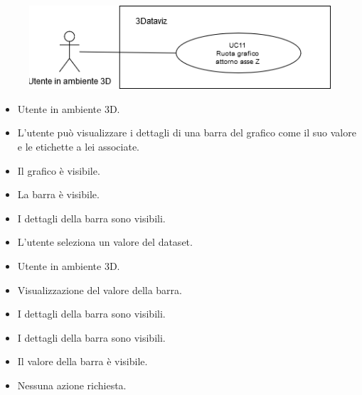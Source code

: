 \begin{figure}[h!]\centering
    \includegraphics[scale=0.7]{template/images/UC11.png}
    \caption{}
\end{figure}
\UCdsc
{ %
    \begin{itemize}
        \item Utente in ambiente 3D.
    \end{itemize}
}
{ %
    \begin{itemize}
        \item L'utente può visualizzare i dettagli di una barra del grafico come il suo valore e le etichette a lei associate.
    \end{itemize}
}
{ %
    \begin{itemize}
        \item Il grafico è visibile.
        \item La barra è visibile.
    \end{itemize}
}
{ %
    \begin{itemize}
        \item I dettagli della barra sono visibili.
    \end{itemize}
}
{ %
    \begin{itemize}
        \item L'utente seleziona un valore del dataset. 
    \end{itemize}
}

\UCdsc
{ %
    \begin{itemize}
        \item Utente in ambiente 3D.
    \end{itemize}
}
{ %
    \begin{itemize}
        \item Visualizzazione del valore della barra.
    \end{itemize}
}
{ %
    \begin{itemize}
        \item I dettagli della barra sono visibili.
    \end{itemize}
}
{ %
    \begin{itemize}
        \item I dettagli della barra sono visibili.
        \item Il valore della barra è visibile.
    \end{itemize}
}
{ %
    \begin{itemize}
        \item Nessuna azione richiesta. 
    \end{itemize}
}

